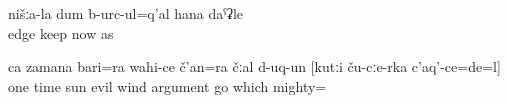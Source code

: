 \begin{exe}
	\ex	\label{ex:Our (people) were fasting like nowadays}
	\gll	nišːa-la	dum	b-urc-ul=q'al	hana	daˁʡle\\
			edge	keep	now	as\\
	\glt	{}

	\ex	\label{ex:Once the sun and the evil wind argued about who is stronger}
	\gll	ca	zamana	bari=ra	wahi-ce	č'an=ra	čːal	d-uq-un	[kutːi	ču-cːe-rka	c'aq'-ce=de=l]\\
		one	time	sun	evil	wind	argument	go	which		mighty=\\
	\glt	{}
\end{exe}

